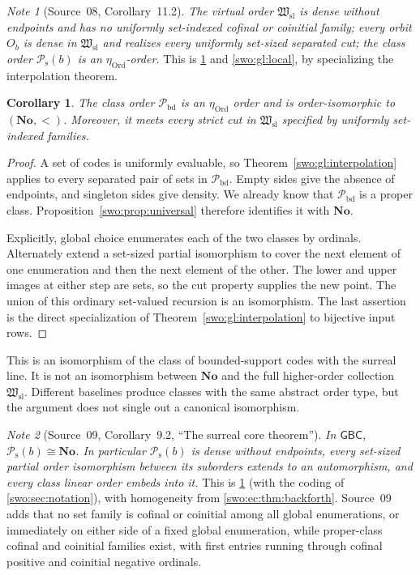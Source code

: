 \documentclass[11pt]{article}
\newtheorem{corollary}[corollary]{Corollary}
\theoremstyle{definition}
\theoremstyle{remark}
\newtheorem{note}[note]{Note}
\newcommand{\No}{\mathbf{No}}
\newcommand{\Ord}{\mathrm{Ord}}
\newcommand{\Hsl}{\mathfrak W_{\mathrm{sl}}}
\newcommand{\Pbd}{\mathcal P_{\mathrm{bd}}}
\newcommand{\Psupp}{\mathcal P_{\mathrm{s}}}
\newcommand{\GBC}{\mathsf{GBC}}
\begin{document}
\begin{note}[Source~08, Corollary~11.2]\label{swo:sk:cor:orbitproperties}
\emph{The virtual order $\Hsl$ is dense without endpoints and has no uniformly
set-indexed cofinal or coinitial family; every orbit $O_b$ is dense in $\Hsl$
and realizes every uniformly set-sized separated cut; the class order
$\Psupp(b)$ is an $\eta_{\Ord}$-order.} This is \cref{swo:gl:pbd-no} and
\cref{swo:gl:local}, by specializing the interpolation theorem.
\end{note}

\begin{corollary}\label{swo:gl:pbd-no}
The class order $\Pbd$ is an $\eta_{\Ord}$ order and is order-isomorphic to
$(\No,<)$.  Moreover, it meets every strict cut in $\Hsl$ specified by
uniformly set-indexed families.
\end{corollary}

\begin{proof}
A set of codes is uniformly evaluable, so Theorem~\ref{swo:gl:interpolation}
applies to every separated pair of sets in $\Pbd$.  Empty sides give the
absence of endpoints, and singleton sides give density.  We already know
that $\Pbd$ is a proper class.  Proposition~\ref{swo:prop:universal} therefore
identifies it with $\No$.

Explicitly, global choice enumerates each of the two classes by ordinals.
Alternately extend a set-sized partial isomorphism to cover the next element
of one enumeration and then the next element of the other.  The lower and
upper images at either step are sets, so the cut property supplies the new
point.  The union of this ordinary set-valued recursion is an isomorphism.
The last assertion is the direct specialization of
Theorem~\ref{swo:gl:interpolation} to bijective input rows.
\end{proof}

This is an isomorphism of the class of bounded-support codes with the surreal
line.  It is not an isomorphism between $\No$ and the full higher-order
collection $\Hsl$.  Different baselines produce classes with the same abstract
order type, but the argument does not single out a canonical isomorphism.


\begin{note}[Source~09, Corollary~9.2, ``The surreal core theorem'']\label{swo:ec:thm:core}
\emph{In $\GBC$, $\Psupp(b)\cong\No$. In particular $\Psupp(b)$ is dense
without endpoints, every set-sized partial order isomorphism between its
suborders extends to an automorphism, and every class linear order embeds into
it.} This is \cref{swo:gl:pbd-no} (with the coding of
\cref{swo:sec:notation}), with homogeneity from \cref{swo:ec:thm:backforth}.
Source~09 adds that no set family is cofinal or coinitial among all global
enumerations, or immediately on either side of a fixed global enumeration,
while proper-class cofinal and coinitial families exist, with first entries
running through cofinal positive and coinitial negative ordinals.
\end{note}
\end{document}
